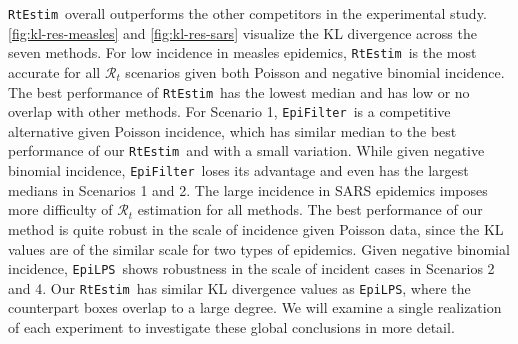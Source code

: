 \documentclass[10pt,letterpaper]{article}
\def\RtEstim{\texttt{RtEstim}}
\def\EpiLPS{\texttt{EpiLPS}}
\def\EpiFilter{\texttt{EpiFilter}}
\def\calR{\mathcal{R}}
\begin{document}
\RtEstim\ overall outperforms the other competitors in the experimental study.
\autoref{fig:kl-res-measles} and \autoref{fig:kl-res-sars} visualize  
the KL divergence across the seven methods. For low incidence in measles epidemics, 
\RtEstim\ is the most accurate for all $\calR_t$ scenarios given both Poisson 
and negative binomial incidence. The best performance of \RtEstim\ has the 
lowest median and has low or no overlap with other methods. 
For Scenario 1, \EpiFilter\ is a competitive alternative given Poisson incidence, 
which has similar median to the best performance of our \RtEstim\ and with a 
small variation. While given negative binomial incidence, \EpiFilter\ loses its 
advantage and even has the largest medians in Scenarios 1 and 2.
The large incidence in SARS epidemics imposes more difficulty of $\calR_t$ estimation 
for all methods. The best performance of our method is quite robust in the scale 
of incidence given Poisson data, since the KL values are of the similar scale for 
two types of epidemics. Given negative binomial incidence, \EpiLPS\ shows robustness 
in the scale of incident cases in Scenarios 2 and 4. Our \RtEstim\ has similar KL divergence 
values as \EpiLPS, where the counterpart boxes overlap to a large degree.
We will examine a single realization of each
experiment to investigate these global conclusions in more detail.
\end{document}
